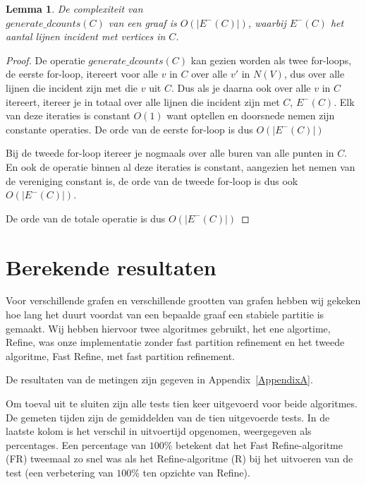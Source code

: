 \documentclass[twoside]{article}
\newtheorem{lemma}[theorem]{Lemma}
\begin{document}
\begin{multicols}{2}
\begin{lemma}
De complexiteit van\\ $generate\_dcounts(C)$ van een graaf is $O(|E^{-}(C)|) $,  waarbij  $E^{-}(C)$ het aantal lijnen incident met vertices in $C$.
\end{lemma}

\begin{proof}
De operatie $generate\_dcounts(C) $ kan gezien worden als twee for-loops, de eerste for-loop, itereert voor alle $v$ in $C$ over alle $v'$ in $N(V)$, dus over alle lijnen die incident zijn met die $v$ uit $C$. Dus als je daarna ook over alle $v$ in $C$ itereert, itereer je in totaal over alle lijnen die incident zijn met $C$, $E^{-}(C)$. Elk van deze iteraties is constant $O(1)$ want optellen en doorsnede nemen zijn constante operaties. De orde van de eerste for-loop is dus $O(|E^{-}(C)|)$

Bij de tweede for-loop itereer je nogmaals over alle buren van alle punten in $C$. En ook de operatie binnen al deze iteraties is constant, aangezien het nemen van de vereniging constant is, de orde van de tweede for-loop is dus ook $O(|E^{-}(C)|)$.

De orde van de totale operatie is dus $O(|E^{-}(C)|)$
\end{proof}


\section{Berekende resultaten}

Voor verschillende grafen en verschillende grootten van grafen hebben wij gekeken hoe lang het duurt voordat van een bepaalde graaf een stabiele partitie is gemaakt. Wij hebben hiervoor twee algoritmes gebruikt, het ene algortime, Refine, was onze implementatie zonder fast partition refinement en het tweede algoritme, Fast Refine, met fast partition refinement.

De resultaten van de metingen zijn gegeven in Appendix~\ref{AppendixA}.

Om toeval uit te sluiten zijn alle tests tien keer uitgevoerd voor beide algoritmes. De gemeten tijden zijn de gemiddelden van de tien uitgevoerde tests. In de laatste kolom is het verschil in uitvoertijd opgenomen, weergegeven als percentages. Een percentage van $100\%$ betekent dat het Fast Refine-algoritme (FR) tweemaal zo snel was als het Refine-algoritme (R) bij het uitvoeren van de test (een verbetering van $100$\% ten opzichte van Refine).


\end{multicols}
\end{document}
